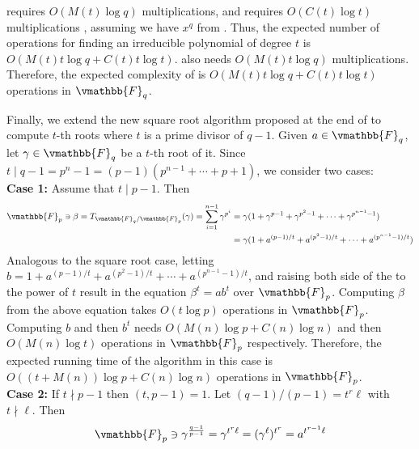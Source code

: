  requires $O(M(t)\log q)$ multiplications, and 
 requires $O(C(t)\log t)$ multiplications \cite{zurShoup1992}, assuming 
we have $x^q$ from . Thus, the expected number of operations for finding 
an irreducible polynomial of degree $t$ is $O(M(t)t\log q + C(t)t\log t)$. 
 also needs $O(M(t)t\log q)$ multiplications. Therefore, the expected 
complexity of  is $O(M(t)t\log q + C(t)t\log t)$ operations in 
$\vmathbb{F}_q$.

Finally, we extend the new square root algorithm proposed at the end of 
 to compute $t$-th roots where $t$ is a prime divisor of $q - 1$. 
Given $a \in \vmathbb{F}_q$, let $\gamma \in \vmathbb{F}_q$ be a $t$-th root of it. Since $t \mid q - 
1 = p^n - 1 = (p - 1)(p^{n - 1} + \cdots + p + 1)$, we consider two cases: \\
\textbf{Case 1:} Assume that $t \mid p - 1$. Then
\begin{equation}
\label{equation:tr-tth}
\begin{aligned}
\vmathbb{F}_p \ni \beta = T_{\vmathbb{F}_q / \vmathbb{F}_p}(\gamma) = \sum_{i = 1}^{n - 1} \gamma^{p^i}
& = \gamma(1 + \gamma^{p - 1} + \gamma^{p^2 - 1} + \cdots + \gamma^{p^{n - 1} -1}) \\
& = \gamma(1 + a^{(p - 1) / t} + a^{(p^2 - 1) / t} + \cdots + a^{(p^{n - 1} -1) / t})
\end{aligned}
\end{equation}
Analogous to the square root case, letting $b = 1 + a^{(p - 1) / t} + a^{(p^2 - 1) / t} + \cdots + 
a^{(p^{n - 1} -1) / t}$, and raising both side of the  to the power of 
$t$ result in the equation $\beta^t = ab^t$ over $\vmathbb{F}_p$. Computing $\beta$ from the above 
equation takes $O(t\log p)$ operations in $\vmathbb{F}_p$. Computing $b$ and then $b^t$ needs 
$O(M(n)\log p + C(n)\log n)$ and then $O(M(n)\log t)$ operations in $\vmathbb{F}_p$ respectively. 
Therefore, the expected running time of the algorithm in this case is $O((t + M(n))\log p + C(n)\log 
n)$ operations in $\vmathbb{F}_p$.\\
\textbf{Case 2:} If $t \nmid p - 1$ then $(t, p - 1) = 1$. Let $(q - 1) / (p - 1) = t^r\ell$ with $t 
\nmid \ell$. Then
\begin{equation}
\label{equation:new-tth}
\vmathbb{F}_p \ni \gamma^{\frac{q - 1}{p - 1}} = \gamma^{t^r\ell} = (\gamma^{\ell})^{t^r} = a^{t^{r - 
1}\ell}
\end{equation}
